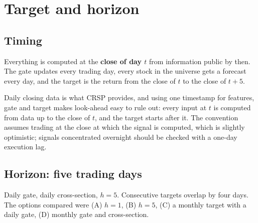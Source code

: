 \section{Target and horizon}
\label{sec:target}

\subsection{Timing}

Everything is computed at the \textbf{close of day $t$} from information public by then. The gate updates
every trading day, every stock in the universe gets a forecast every day, and the target is the return
from the close of $t$ to the close of $t+5$.

\begin{whybox}
Daily closing data is what CRSP provides, and using one timestamp for features, gate and target makes
look-ahead easy to rule out: every input at $t$ is computed from data up to the close of $t$, and the
target starts after it. The convention assumes trading at the close at which the signal is computed,
which is slightly optimistic; signals concentrated overnight should be checked with a one-day execution
lag.
\end{whybox}

\subsection{Horizon: five trading days}

 Daily gate, daily cross-section, \textbf{$h=5$}. Consecutive targets overlap by
four days. The options compared were (A) $h=1$, (B) $h=5$, (C) a monthly target with a daily gate,
(D) monthly gate and cross-section.

